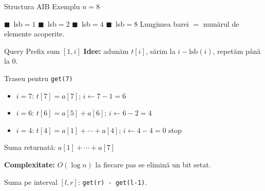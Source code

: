 \documentclass[10pt]{beamer}
\begin{document}
\begin{frame}{Structura AIB \textemdash{} Exemplu $n = 8$}
\begin{center}
  \end{center}
  \vspace{-4pt}
  {\footnotesize
  \textcolor{green!60!black}{$\blacksquare$}~lsb$=1$\enspace
  \textcolor{orange!70!black}{$\blacksquare$}~lsb$=2$\enspace
  \textcolor{teal!70!black}{$\blacksquare$}~lsb$=4$\enspace
  \textcolor{violet!70!black}{$\blacksquare$}~lsb$=8$\quad
  Lungimea barei $=$ numărul de elemente acoperite.}
\end{frame}

\begin{frame}{Query \textemdash{} Prefix sum $[1, i]$}
  \textbf{Idee:} adunăm $t[i]$, sărim la $i - \text{lsb}(i)$, repetăm până la 0.
  \begin{block}{Traseu pentru \texttt{get(7)}}
    \begin{itemize}\itemsep0pt
      \item $i=7$: $t[7]=a[7]$; $i \leftarrow 7-1 = 6$
      \item $i=6$: $t[6]=a[5]{+}a[6]$; $i \leftarrow 6-2 = 4$
      \item $i=4$: $t[4]=a[1]{+}{\cdots}{+}a[4]$; $i \leftarrow 4-4 = 0$ \textemdash{} stop
    \end{itemize}
    Suma returnată: $a[1]+\cdots+a[7]$ \checkmark
  \end{block}
  \smallskip
  \textbf{Complexitate:} $O(\log n)$ \textemdash{} la fiecare pas se elimină un bit setat.

  Suma pe interval $[l, r]$: \texttt{get(r) - get(l-1)}.
\end{frame}
\end{document}
